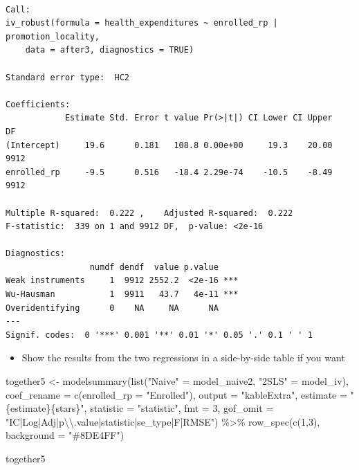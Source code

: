 \documentclass[
  letterpaper,
  DIV=11,
  numbers=noendperiod]{scrartcl}
\newenvironment{Shaded}{\begin{snugshade}}{\end{snugshade}}
\newcommand{\AttributeTok}[1]{\textcolor[rgb]{0.40,0.45,0.13}{#1}}
\newcommand{\DecValTok}[1]{\textcolor[rgb]{0.68,0.00,0.00}{#1}}
\newcommand{\FunctionTok}[1]{\textcolor[rgb]{0.28,0.35,0.67}{#1}}
\newcommand{\NormalTok}[1]{\textcolor[rgb]{0.00,0.23,0.31}{#1}}
\newcommand{\OtherTok}[1]{\textcolor[rgb]{0.00,0.23,0.31}{#1}}
\newcommand{\SpecialCharTok}[1]{\textcolor[rgb]{0.37,0.37,0.37}{#1}}
\newcommand{\StringTok}[1]{\textcolor[rgb]{0.13,0.47,0.30}{#1}}
\providecommand{\tightlist}{%
  \setlength{\itemsep}{0pt}\setlength{\parskip}{0pt}}\usepackage{longtable,booktabs,array}
\begin{document}
\begin{verbatim}

Call:
iv_robust(formula = health_expenditures ~ enrolled_rp | promotion_locality, 
    data = after3, diagnostics = TRUE)

Standard error type:  HC2 

Coefficients:
            Estimate Std. Error t value Pr(>|t|) CI Lower CI Upper   DF
(Intercept)     19.6      0.181   108.8 0.00e+00     19.3    20.00 9912
enrolled_rp     -9.5      0.516   -18.4 2.29e-74    -10.5    -8.49 9912

Multiple R-squared:  0.222 ,    Adjusted R-squared:  0.222 
F-statistic:  339 on 1 and 9912 DF,  p-value: <2e-16

Diagnostics:
                 numdf dendf  value p.value    
Weak instruments     1  9912 2552.2  <2e-16 ***
Wu-Hausman           1  9911   43.7   4e-11 ***
Overidentifying      0    NA     NA      NA    
---
Signif. codes:  0 '***' 0.001 '**' 0.01 '*' 0.05 '.' 0.1 ' ' 1
\end{verbatim}

\begin{itemize}
\tightlist
\item
  Show the results from the two regressions in a side-by-side table if
  you want
\end{itemize}

\begin{Shaded}
\begin{Highlighting}[numbers=left,,]
\NormalTok{together5 }\OtherTok{\textless{}{-}} \FunctionTok{modelsummary}\NormalTok{(}\FunctionTok{list}\NormalTok{(}\StringTok{"Naive"} \OtherTok{=}\NormalTok{ model\_naive2,}
                               \StringTok{"2SLS"} \OtherTok{=}\NormalTok{ model\_iv),}
             \AttributeTok{coef\_rename =} \FunctionTok{c}\NormalTok{(}\AttributeTok{enrolled\_rp =} \StringTok{"Enrolled"}\NormalTok{),}
             \AttributeTok{output =} \StringTok{"kableExtra"}\NormalTok{,}
             \AttributeTok{estimate =} \StringTok{"\{estimate\}\{stars\}"}\NormalTok{,}
             \AttributeTok{statistic =} \StringTok{"statistic"}\NormalTok{,}
             \AttributeTok{fmt =}  \DecValTok{3}\NormalTok{,}
             \AttributeTok{gof\_omit =} \StringTok{"IC|Log|Adj|p}\SpecialCharTok{\textbackslash{}\textbackslash{}}\StringTok{.value|statistic|se\_type|F|RMSE"}\NormalTok{) }\SpecialCharTok{\%\textgreater{}\%} 
  \FunctionTok{row\_spec}\NormalTok{(}\FunctionTok{c}\NormalTok{(}\DecValTok{1}\NormalTok{,}\DecValTok{3}\NormalTok{), }\AttributeTok{background =} \StringTok{"\#8DE4FF"}\NormalTok{) }

\NormalTok{together5}
\end{Highlighting}
\end{Shaded}
\end{document}
